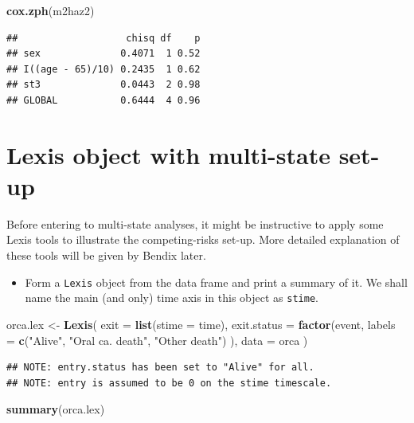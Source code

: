 \documentclass[
]{book}
\newenvironment{Shaded}{\begin{snugshade}}{\end{snugshade}}
\newcommand{\AttributeTok}[1]{\textcolor[rgb]{0.13,0.29,0.53}{#1}}
\newcommand{\FunctionTok}[1]{\textcolor[rgb]{0.13,0.29,0.53}{\textbf{#1}}}
\newcommand{\NormalTok}[1]{#1}
\newcommand{\OtherTok}[1]{\textcolor[rgb]{0.56,0.35,0.01}{#1}}
\newcommand{\StringTok}[1]{\textcolor[rgb]{0.31,0.60,0.02}{#1}}
\providecommand{\tightlist}{%
  \setlength{\itemsep}{0pt}\setlength{\parskip}{0pt}}
\theoremstyle{definition}
\theoremstyle{definition}
\theoremstyle{definition}
\theoremstyle{definition}
\theoremstyle{remark}
\begin{document}
\begin{Shaded}
\begin{Highlighting}[]
\FunctionTok{cox.zph}\NormalTok{(m2haz2)}
\end{Highlighting}
\end{Shaded}

\begin{verbatim}
##                   chisq df    p
## sex              0.4071  1 0.52
## I((age - 65)/10) 0.2435  1 0.62
## st3              0.0443  2 0.98
## GLOBAL           0.6444  4 0.96
\end{verbatim}

\section{Lexis object with multi-state set-up}\label{lexis-object-with-multi-state-set-up}

Before entering to multi-state analyses, it might be instructive to
apply some Lexis tools to illustrate the competing-risks set-up. More
detailed explanation of these tools will be given by Bendix later.

\begin{itemize}
\tightlist
\item
  Form a \texttt{Lexis} object from the data frame and print a summary of it.
  We shall name the main (and only) time axis in this object as \texttt{stime}.
\end{itemize}

\begin{Shaded}
\begin{Highlighting}[]
\NormalTok{orca.lex }\OtherTok{\textless{}{-}} \FunctionTok{Lexis}\NormalTok{(}
  \AttributeTok{exit =} \FunctionTok{list}\NormalTok{(}\AttributeTok{stime =}\NormalTok{ time),}
  \AttributeTok{exit.status =} \FunctionTok{factor}\NormalTok{(event,}
    \AttributeTok{labels =} \FunctionTok{c}\NormalTok{(}\StringTok{"Alive"}\NormalTok{, }\StringTok{"Oral ca. death"}\NormalTok{, }\StringTok{"Other death"}\NormalTok{)}
\NormalTok{  ),}
  \AttributeTok{data =}\NormalTok{ orca}
\NormalTok{)}
\end{Highlighting}
\end{Shaded}

\begin{verbatim}
## NOTE: entry.status has been set to "Alive" for all.
## NOTE: entry is assumed to be 0 on the stime timescale.
\end{verbatim}

\begin{Shaded}
\begin{Highlighting}[]
\FunctionTok{summary}\NormalTok{(orca.lex)}
\end{Highlighting}
\end{Shaded}
\end{document}
